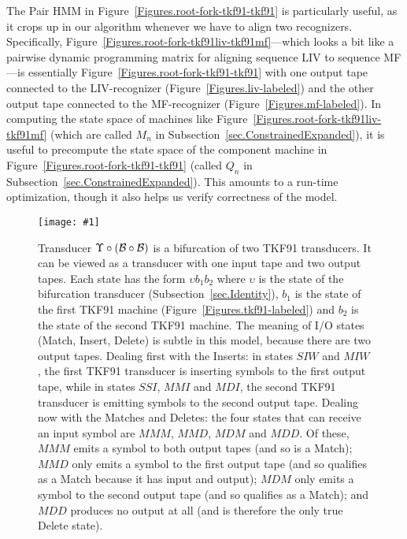 \documentclass{article}
\newcommand{\secref}[1]{Subsection~\ref{sec.#1}}
\newcommand{\figref}[1]{Figure~\ref{Figures.#1}}
\newcommand{\figlabel}[1]{\label{Figures.#1}}
\newcommand{\easyfig}[4]{
\begin{figure}
\texttt{[image: \#1]}
\caption{ \figlabel{#3} #4}
\end{figure}}
\newcommand{\widepdffig}[2]{\easyfig{#1-fig.pdf}{width=\textwidth}{#1}{#2}}
\newcommand\tkf{{\cal B}}
\newcommand\fork{\circ}
\newcommand\idfork{\Upsilon}
\begin{document}
The Pair HMM in \figref{root-fork-tkf91-tkf91} is particularly useful, as it crops up in our algorithm
whenever we have to align two recognizers. Specifically, 
\figref{root-fork-tkf91liv-tkf91mf}---which looks a bit like a pairwise dynamic programming matrix
for aligning sequence LIV to sequence MF---is essentially
\figref{root-fork-tkf91-tkf91} with one output tape connected to the LIV-recognizer (\figref{liv-labeled})
and the other output tape connected to the MF-recognizer (\figref{mf-labeled}).
In computing the state space of machines like \figref{root-fork-tkf91liv-tkf91mf}
(which are called $M_n$ in \secref{ConstrainedExpanded}),
it is useful to precompute the state space of the component machine in \figref{root-fork-tkf91-tkf91}
(called $Q_n$ in \secref{ConstrainedExpanded}).
This amounts to a run-time optimization, though it also helps us verify correctness of the model.

\widepdffig{fork-tkf91-tkf91}{
Transducer $\idfork \circ (\tkf \fork \tkf)$ is a bifurcation of two TKF91 transducers.
It can be viewed as a transducer with one input tape and two output tapes.
Each state has the form $\upsilon b_1 b_2$ where
 $\upsilon$ is the state of the bifurcation transducer (\secref{Identity}),
 $b_1$ is the state of the first TKF91 machine (\figref{tkf91-labeled}) and $b_2$ is the state of the second TKF91 machine.
The meaning of I/O states (Match, Insert, Delete) is subtle in this model, because there are two output tapes.
Dealing first with the Inserts:
in states $SIW$ and $MIW$, the first TKF91 transducer is inserting symbols to the first output tape,
while in states $SSI$, $MMI$ and $MDI$, the second TKF91 transducer is emitting symbols to the second output tape.
Dealing now with the Matches and Deletes:
the four states that can receive an input symbol
are $MMM$, $MMD$, $MDM$ and $MDD$.
Of these,
$MMM$ emits a symbol to both output tapes (and so is a Match);
$MMD$ only emits a symbol to the first output tape (and so qualifies as a Match because it has input and output);
$MDM$ only emits a symbol to the second output tape (and so qualifies as a Match);
and $MDD$ produces no output at all (and is therefore the only true Delete state).
}
\end{document}
